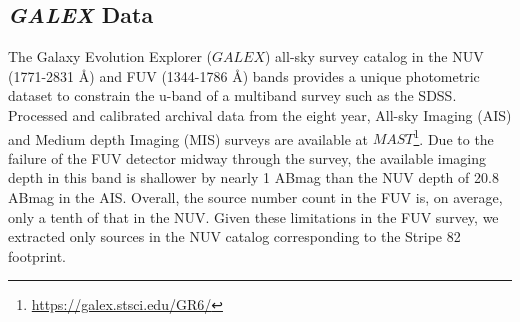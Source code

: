 \documentclass{aastex63}
\begin{document}





 



        

\subsection{{\it GALEX} Data} \label{ssec:galex}

The Galaxy Evolution Explorer ($GALEX$) all-sky survey catalog in the NUV (1771-2831 \AA) and FUV (1344-1786 \AA) bands provides a unique photometric dataset to constrain the u-band of a multiband survey such as the SDSS. Processed and calibrated archival data from the eight year, All-sky Imaging (AIS) and Medium depth Imaging (MIS) surveys are available at $MAST$\footnote{\url{https://galex.stsci.edu/GR6/}}. Due to the failure of the FUV detector midway through the survey, the available imaging depth in this band is shallower by nearly 1 ABmag than the NUV depth of 20.8 ABmag in the AIS. Overall, the source number count in the FUV is, on average, only a tenth of that in the NUV. Given these limitations in the FUV survey, we extracted only sources in the NUV catalog corresponding to the Stripe 82 footprint.  
 
\end{document}
